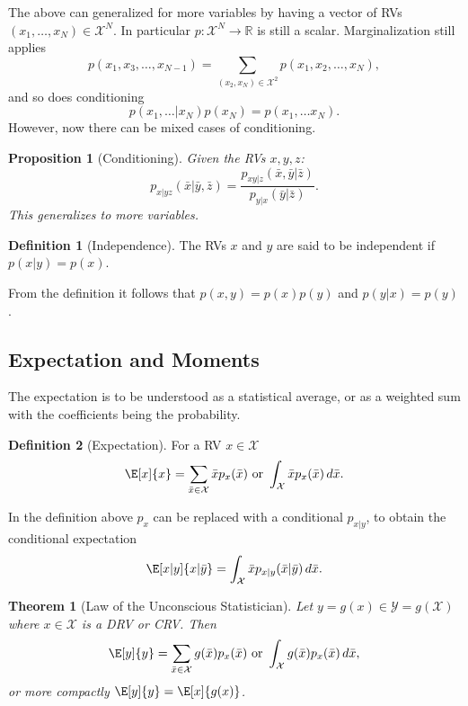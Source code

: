 \documentclass[]{hsrzf}
\theoremstyle{plain}
\newtheorem{thm}{Theorem}[section]
\newtheorem{prop}{Proposition}[section]
\theoremstyle{definition}
\newtheorem{defn}{Definition}[section]
\theoremstyle{remark}
\begin{document}
The above can generalized for more variables by having a vector of RVs
$(x_1,\ldots, x_N) \in \mathcal{X}^N$. In particular $p : \mathcal{X}^N \to
\mathbb{R}$ is still a scalar. Marginalization still applies
\[
  p(x_1, x_3, \ldots, x_{N-1}) = \sum_{(x_{2}, x_{N}) \in \mathcal{X}^2}
  p(x_1, x_2, \ldots, x_N),
\]
and so does conditioning
\[
  p(x_1, \ldots | x_N) p(x_N) = p(x_1, \ldots x_N).
\]
However, now there can be mixed cases of conditioning.
\begin{prop}[Conditioning]
  Given the RVs $x, y, z$:
  \[
    p_{x|yz}(\bar{x} | \bar{y}, \bar{z}) = 
      \frac{p_{xy|z}(\bar{x},\bar{y} | \bar{z})}{p_{y|x}(\bar{y} | \bar{z})}.
  \]
  This generalizes to more variables.
\end{prop}


\begin{defn}[Independence]
  The RVs $x$ and $y$ are said to be independent if $p(x|y) = p(x)$.
\end{defn}

From the definition it follows that $p(x,y) = p(x)p(y)$ and $p(y|x) = p(y)$.

\subsection{Expectation and Moments}

The expectation is to be understood as a statistical average, or as a weighted
sum with the coefficients being the probability.

\begin{defn}[Expectation]
  For a RV $x \in \mathcal{X}$
  \[
    \E[x]{x}
       = \sum_{\bar{x} \in \mathcal{X}} \bar{x} p_x(\bar{x})
       \text{ or }
       \int_\mathcal{X} \bar{x} p_x(\bar{x}) \, d\bar{x}.
  \]
\end{defn}

In the definition above $p_x$ can be replaced with a conditional $p_{x|y}$, to
obtain the conditional expectation
\[
  \E[x|y]{x | \bar{y}} 
    = \int_\mathcal{X} \bar{x} p_{x|y}(\bar{x} | \bar{y}) \, d\bar{x}.
\]

\begin{thm}[Law of the Unconscious Statistician]
  Let $y = g(x) \in \mathcal{Y} = g(\mathcal{X})$ where $x \in \mathcal{X}$ is
  a DRV or CRV. Then
  \[
    \E[y]{y} = \sum_{\bar{x} \in \mathcal{X}} g(\bar{x}) p_x(\bar{x})
      \text{ or }
      \int_\mathcal{X} g(\bar{x}) p_x(\bar{x}) \, d\bar{x},
  \]
  or more compactly $\E[y]{y} = \E[x]{g(x)}$.
\end{thm}
\end{document}
